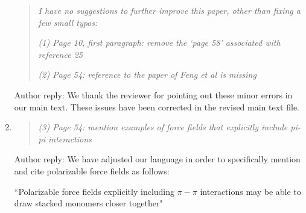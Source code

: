 \documentclass{article}
\begin{document}
\begin{enumerate}
\begin{quote}
	\textit{I have no suggestions to further improve this paper, other than fixing a few small typos:}
	
    \textit{(1) Page 10, first paragraph: remove the ‘page 58’ associated with reference 25}

    \textit{(2) Page 54: reference to the paper of Feng et al is missing}

	\end{quote}
    
    Author reply: We thank the reviewer for pointing out these minor errors in our main text. These issues have been corrected in
    the revised main text file. %
    
    \item \begin{quote} \textit{(3) Page 54: mention examples of force fields that explicitly include pi-pi interactions
    } \end{quote}
    
    Author reply: We have adjusted our language in order to specifically mention and cite polarizable force fields as follows: 
    
    ``Polarizable force fields explicitly including $\pi-\pi$ interactions may be able to draw stacked
    monomers closer together"

\end{enumerate}
\end{document}

